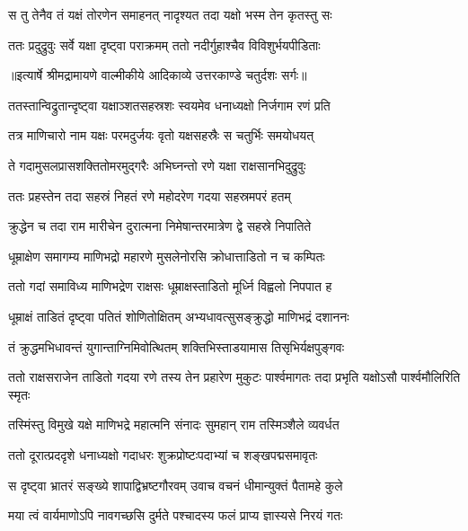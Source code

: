 \twolineshloka
{स तु तेनैव तं यक्षं तोरणेन समाहनत्}
{नादृश्यत तदा यक्षो भस्म तेन कृतस्तु सः} %

\twolineshloka
{ततः प्रदुद्रुवुः सर्वे यक्षा दृष्ट्वा पराक्रमम्}
{ततो नदीर्गुहाश्चैव विविशुर्भयपीडिताः} %


{॥इत्यार्षे श्रीमद्रामायणे वाल्मीकीये आदिकाव्ये उत्तरकाण्डे चतुर्दशः सर्गः॥}


\twolineshloka
{ततस्तान्विद्रुतान्दृष्ट्वा यक्षाञ्शतसहस्रशः}
{स्वयमेव धनाध्यक्षो निर्जगाम रणं प्रति} %

\twolineshloka
{तत्र माणिचारो नाम यक्षः परमदुर्जयः}
{वृतो यक्षसहस्रैः स चतुर्भिः समयोधयत्} %

\twolineshloka
{ते गदामुसलप्रासशक्तितोमरमुद्गरैः}
{अभिघ्नन्तो रणे यक्षा राक्षसानभिदुद्रुवुः} %

\twolineshloka
{ततः प्रहस्तेन तदा सहस्रं निहतं रणे}
{महोदरेण गदया सहस्रमपरं हतम्} %

\twolineshloka
{क्रुद्धेन च तदा राम मारीचेन दुरात्मना}
{निमेषान्तरमात्रेण द्वे सहस्रे निपातिते} %

\twolineshloka
{धूम्राक्षेण समागम्य माणिभद्रो महारणे}
{मुसलेनोरसि क्रोधात्ताडितो न च कम्पितः} %

\twolineshloka
{ततो गदां समाविध्य माणिभद्रेण राक्षसः}
{धूम्राक्षस्ताडितो मूर्ध्नि विह्वलो निपपात ह} %

\twolineshloka
{धूम्राक्षं ताडितं दृष्ट्वा पतितं शोणितोक्षितम्}
{अभ्यधावत्सुसङ्क्रुद्धो माणिभद्रं दशाननः} %

\twolineshloka
{तं क्रुद्धमभिधावन्तं युगान्ताग्निमिवोत्थितम्}
{शक्तिभिस्ताडयामास तिसृभिर्यक्षपुङ्गवः} %

\threelineshloka
{ततो राक्षसराजेन ताडितो गदया रणे}
{तस्य तेन प्रहारेण मुकुटः पार्श्वमागतः}
{तदा प्रभृति यक्षोऽसौ पार्श्वमौलिरिति स्मृतः} %

\twolineshloka
{तस्मिंस्तु विमुखे यक्षे माणिभद्रे महात्मनि}
{संनादः सुमहान् राम तस्मिञ्शैले व्यवर्धत} %

\twolineshloka
{ततो दूरात्प्रददृशे धनाध्यक्षो गदाधरः}
{शुक्रप्रोष्टःपदाभ्यां च शङ्खपद्मसमावृतः} %

\twolineshloka
{स दृष्ट्वा भ्रातरं सङ्ख्ये शापाद्विभ्रष्टगौरवम्}
{उवाच वचनं धीमान्युक्तं पैतामहे कुले} %

\twolineshloka
{मया त्वं वार्यमाणोऽपि नावगच्छसि दुर्मते}
{पश्चादस्य फलं प्राप्य ज्ञास्यसे निरयं गतः} %

